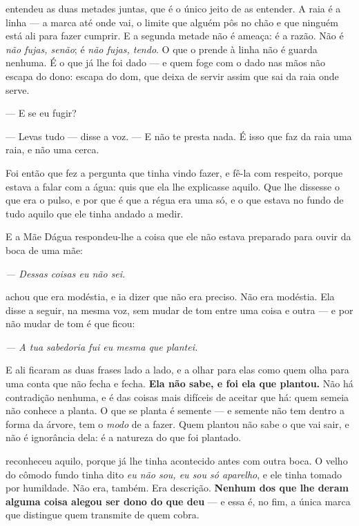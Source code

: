 \documentclass[livro.tex]{subfiles}
\begin{document}
\noindent \Ben entendeu as duas metades juntas, que é o único jeito de as
entender. A raia é a linha --- a marca até onde vai, o limite que alguém pôs no
chão e que ninguém está ali para fazer cumprir. E a segunda metade não é ameaça:
é a razão. Não é \emph{não fujas, senão}; é \emph{não fujas, tendo}. O que o
prende à linha não é guarda nenhuma. É o que já lhe foi dado --- e quem foge
com o dado nas mãos não escapa do dono: escapa do dom, que deixa de servir
assim que sai da raia onde serve.

\medskip
\noindent --- E se eu fugir?

--- Levas tudo --- disse a voz. --- E não te presta nada. É isso que faz da
raia uma raia, e não uma cerca.

\medskip
\noindent Foi então que \Ben fez a pergunta que tinha vindo fazer, e fê-la
com respeito, porque estava a falar com a água: quis que ela lhe explicasse
aquilo. Que lhe dissesse o que era o pulso, e por que é que a régua era uma só,
e o que estava no fundo de tudo aquilo que ele tinha andado a medir.

\medskip
\noindent E a Mãe Dágua respondeu-lhe a coisa que ele não estava preparado para
ouvir da boca de uma mãe:

\begin{center}
\emph{--- Dessas coisas eu não sei.}
\end{center}

\medskip
\noindent \Ben achou que era modéstia, e ia dizer que não era preciso. Não
era modéstia. Ela disse a seguir, na mesma voz, sem mudar de tom entre uma
coisa e outra --- e por não mudar de tom é que ficou:

\begin{center}
\emph{--- A tua sabedoria fui eu mesma que plantei.}
\end{center}

\medskip
\noindent E ali ficaram as duas frases lado a lado, e \Ben a olhar para elas
como quem olha para uma conta que não fecha e fecha. \textbf{Ela não sabe, e foi
ela que plantou.} Não há contradição nenhuma, e é das coisas mais difíceis de
aceitar que há: quem semeia não conhece a planta. O que se planta é semente ---
e semente não tem dentro a forma da árvore, tem o \emph{modo} de a fazer. Quem
plantou não sabe o que vai sair, e não é ignorância dela: é a natureza do que
foi plantado.

\medskip
\noindent \Ben reconheceu aquilo, porque já lhe tinha acontecido antes com
outra boca. O velho do cômodo fundo tinha dito \emph{eu não sou, eu sou só
aparelho}, e ele tinha tomado por humildade. Não era, também. Era descrição.
\textbf{Nenhum dos que lhe deram alguma coisa alegou ser dono do que deu} --- e
essa é, no fim, a única marca que distingue quem transmite de quem cobra.
\end{document}
